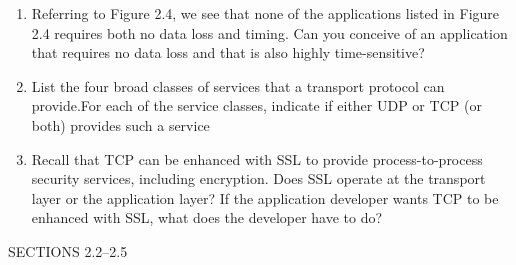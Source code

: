\begin{enumerate}
{}


\item Referring to Figure 2.4, we see that none of the applications listed in Figure 2.4 requires both no data loss and timing. Can you conceive of an application that requires no data loss and that is also highly time-sensitive?



\item List the four broad classes of services that a transport protocol can provide.For each of the service classes, indicate if either UDP or TCP (or both) provides such a service


\item Recall that TCP can be enhanced with SSL to provide process-to-process security services, including encryption. Does SSL operate at the transport layer or the application layer? If the application developer wants TCP to be enhanced with SSL, what does the developer have to do?



\end{enumerate}

SECTIONS 2.2–2.5


